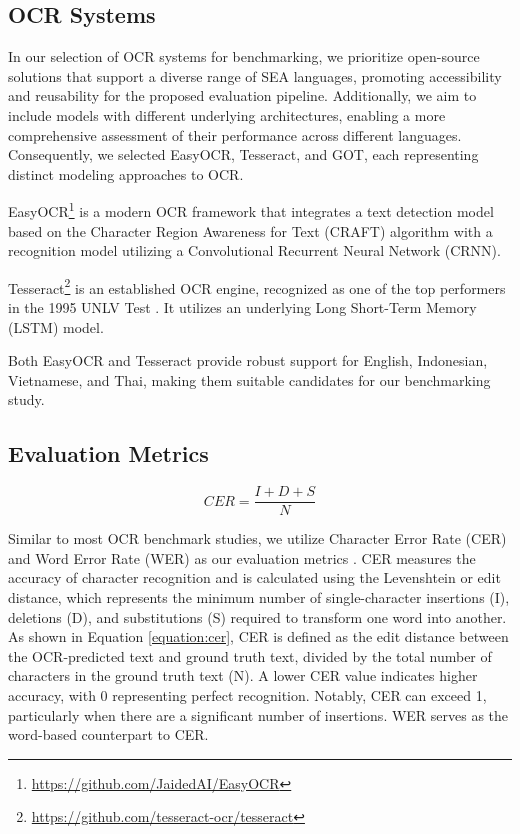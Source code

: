 \documentclass[12pt,oneside]{memoir}
\begin{document}
\subsection{OCR Systems}

In our selection of OCR systems for benchmarking, we prioritize open-source 
solutions that support a diverse range of SEA languages, promoting accessibility and reusability for the proposed evaluation pipeline. 
Additionally, we aim to include models with different underlying architectures, enabling a more comprehensive assessment of their performance across different languages.
Consequently, we selected EasyOCR, Tesseract, and GOT, each representing distinct modeling approaches to OCR.

EasyOCR\footnote{\url{https://github.com/JaidedAI/EasyOCR}} is a modern OCR framework that integrates a text detection model 
based on the Character Region Awareness for Text (CRAFT) algorithm with a 
recognition model utilizing a Convolutional Recurrent Neural Network (CRNN).

Tesseract\footnote{\url{https://github.com/tesseract-ocr/tesseract}} is an established OCR engine, recognized as one of the top performers in the 1995 UNLV Test \parencite{rice-etal-1995}. It utilizes an underlying Long Short-Term Memory (LSTM) model. 

Both EasyOCR and Tesseract provide robust support for English, Indonesian, Vietnamese, and Thai, making them suitable candidates for our benchmarking study.


\subsection{Evaluation Metrics}

\begin{equation}
    CER = \frac{I + D + S}{N}
    \label{equation:cer}
\end{equation}

Similar to most OCR benchmark studies, we utilize Character Error Rate (CER) and 
Word Error Rate (WER) as our evaluation metrics \parencite{hegghammer-2022, ignat-etal-2022}. CER measures the accuracy of 
character recognition and is calculated using the Levenshtein or edit distance, 
which represents the minimum number of single-character insertions (I), deletions (D), 
and substitutions (S) required to transform one word into another. As shown in 
Equation \ref{equation:cer}, CER is defined as the edit distance between the 
OCR-predicted text and ground truth text, divided by the total number of characters 
in the ground truth text (N). A lower CER value indicates higher accuracy, with 
0 representing perfect recognition. Notably, CER can exceed 1, particularly when 
there are a significant number of insertions. WER serves as the word-based counterpart to CER.
\end{document}
